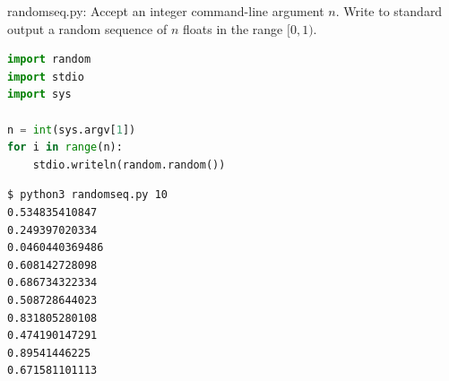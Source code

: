 \documentclass[8pt,a4paper,compress]{beamer}
\begin{document}
\begin{frame}[fragile]
\pause

\begin{framed}
\tiny randomseq.py: Accept an integer command-line argument $n$. Write to standard output a random sequence of $n$ floats in the range $[0, 1)$.
\end{framed}

\begin{lstlisting}[language=Python,style=focusin]
import random
import stdio
import sys

n = int(sys.argv[1])
for i in range(n):
    stdio.writeln(random.random())
\end{lstlisting}

\pause\bigskip

\begin{lstlisting}[language={},style=focusin]
$ python3 randomseq.py 10
0.534835410847
0.249397020334
0.0460440369486
0.608142728098
0.686734322334
0.508728644023
0.831805280108
0.474190147291
0.89541446225
0.671581101113
\end{lstlisting}
\end{frame}
\end{document}
